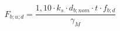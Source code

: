 \documentclass[12pt]{article}
\begin{document}
\begin{displaymath}
F_{b;u;d} = \frac {1,10 \cdot k_s \cdot d_{b;nom} \cdot t \cdot f_{b;d} } {\gamma_M}
\end{displaymath}
\end{document}
